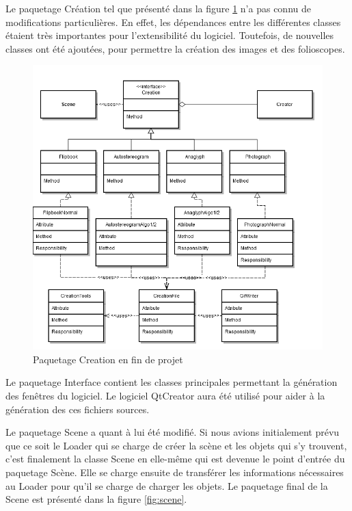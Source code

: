 Le paquetage Création tel que présenté dans la figure \ref{fig:creation} n'a pas connu de modifications particulières. En effet, les dépendances entre les différentes classes étaient très importantes pour l'extensibilité du logiciel. Toutefois, de nouvelles classes ont été ajoutées, pour permettre la création des images et des folioscopes.

\begin{figure}[h]
		\centering
                \includegraphics[scale=0.5]{f_creation.png}
		\caption{\label{fig:creation} Paquetage Creation en fin de projet \protect \footnotemark}
\end{figure}


Le paquetage Interface contient les classes principales permettant la génération des fenêtres du logiciel. Le logiciel QtCreator aura été utilisé pour aider à la génération des ces fichiers sources.

Le paquetage Scene a quant à lui été modifié. Si nous avions initialement prévu que ce soit le Loader qui se charge de créer la scène et les objets qui s'y trouvent, c'est finalement la classe Scene en elle-même qui est devenue le point d'entrée du paquetage Scène. Elle se charge ensuite de transférer les informations nécessaires au Loader pour qu'il se charge de charger les objets. Le paquetage final de la Scene est présenté dans la figure \ref{fig:scene}.

